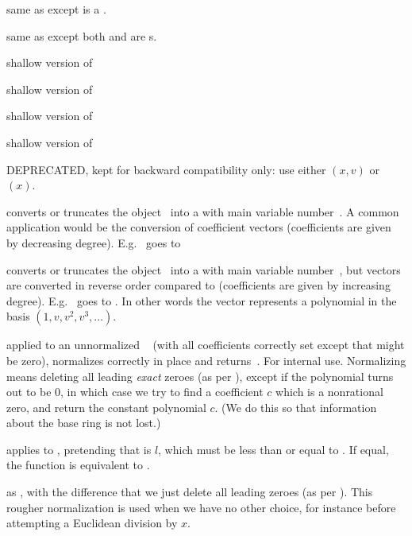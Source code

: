  same as  except  is a
.

 same as  except both
 and  are s.

 shallow version of 

 shallow version of 

 shallow version of 

 shallow version of 

 DEPRECATED, kept for backward
compatibility only: use either $(x,v)$ or $(x)$.


 converts or truncates the object~
into a  with main variable number~. A common application
would be the conversion of coefficient vectors (coefficients are given by
decreasing degree). E.g.~\kbd{[2,3]} goes to 

 converts or truncates the object~
into a  with main variable number~, but vectors are converted
in reverse order compared to  (coefficients are given by
increasing degree). E.g.~\kbd{[2,3]} goes to . In other words
the vector represents a polynomial in the basis $(1,v,v^2,v^3,\dots)$.

 applied to an unnormalized ~
(with all coefficients correctly set except that  might
be zero), normalizes  correctly in place and returns~. For
internal use. Normalizing means deleting all leading \emph{exact} zeroes
(as per ), except if the polynomial turns out to be $0$,
in which case we try to find a coefficient $c$ which is a nonrational zero,
and return the constant polynomial $c$. (We do this so that information
about the base ring is not lost.)

 applies  to
, pretending that  is $l$, which must be less than
or equal to . If equal, the function is equivalent to
.

 as ,
with the difference that we just delete all leading zeroes (as per
). This rougher normalization is used when we have no other
choice, for instance before attempting a Euclidean division by $x$.

